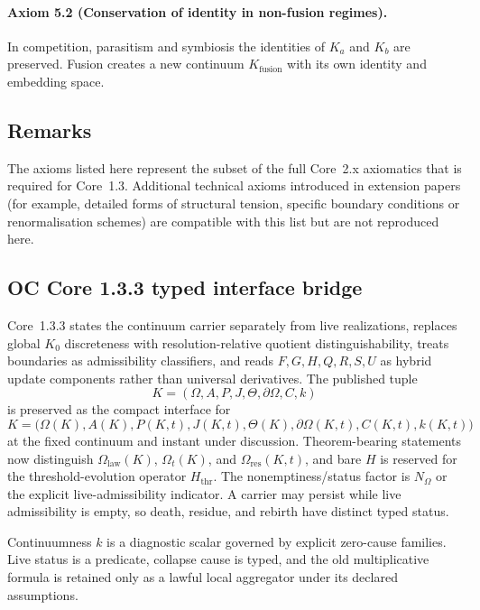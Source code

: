 \paragraph{Axiom 5.2 (Conservation of identity in non-fusion regimes).}
In competition, parasitism and symbiosis the identities of \(K_a\) and \(K_b\)
are preserved.  Fusion creates a new continuum \(K_{\mathrm{fusion}}\) with its
own identity and embedding space.

\subsection{Remarks}

The axioms listed here represent the subset of the full Core~2.x axiomatics
that is required for Core~1.3. Additional technical axioms introduced in
extension papers (for example, detailed forms of structural tension, specific
boundary conditions or renormalisation schemes) are compatible with this list
but are not reproduced here.


\subsection{OC Core 1.3.3 typed interface bridge}
\label{sec:oc133-axioms-scientific-closure-bridge}

Core~1.3.3 states the continuum carrier separately from live realizations,
replaces global \(K_0\) discreteness with resolution-relative quotient
distinguishability, treats boundaries as admissibility classifiers, and reads
\(F,G,H,Q,R,S,U\) as hybrid update components rather than universal
derivatives.  The published tuple
\[
K=(\Omega,A,P,J,\Theta,\partial\Omega,C,k)
\]
is preserved as the compact interface for
\[
K=\big(\Omega(K),A(K),P(K,t),J(K,t),\Theta(K),
       \partial\Omega(K,t),C(K,t),k(K,t)\big)
\]
at the fixed continuum and instant under discussion.  Theorem-bearing
statements now distinguish \(\Omega_{\mathrm{law}}(K)\), \(\Omega_t(K)\), and
\(\Omega_{\mathrm{res}}(K,t)\), and bare \(H\) is reserved for the
threshold-evolution operator \(H_{\mathrm{thr}}\).  The nonemptiness/status
factor is \(N_{\Omega}\) or the explicit live-admissibility indicator. A carrier may
persist while live admissibility is empty, so death, residue, and rebirth have
distinct typed status.

Continuumness \(k\) is a diagnostic scalar governed by explicit zero-cause
families.  Live status is a predicate, collapse cause is typed, and the old
multiplicative formula is retained only as a lawful local aggregator under its
declared assumptions.
